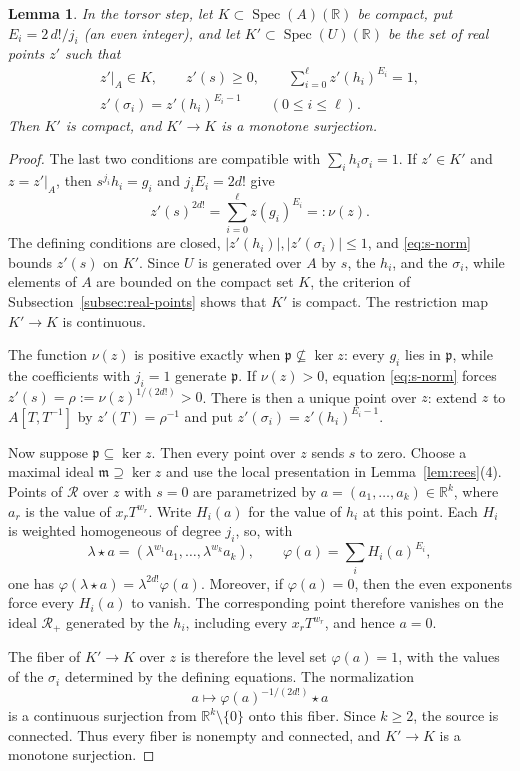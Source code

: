 \documentclass[11pt]{amsart}
\numberwithin{equation}{section}
\newtheorem{lemma}[theorem]{Lemma}
\theoremstyle{definition}
\newcommand{\R}{\mathbb{R}}
\newcommand{\fm}{\mathfrak{m}}
\newcommand{\fp}{\mathfrak{p}}
\newcommand{\cR}{\mathcal{R}}
\DeclareMathOperator{\Spec}{Spec}
\begin{document}
\begin{lemma}\label{lem:sphere-bundle}
In the torsor step, let $K\subset\Spec(A)(\R)$ be compact, put $E_i=2\,d!/j_i$ (an even integer), and let $K'\subset\Spec(U)(\R)$ be the set of real points $z'$ such that
\[
  \begin{gathered}
    z'|_A\in K,\qquad z'(s)\ge0,\qquad
    \sum_{i=0}^\ell z'(h_i)^{E_i}=1,\\
    z'(\sigma_i)=z'(h_i)^{E_i-1}\qquad(0\le i\le\ell).
  \end{gathered}
\]
Then $K'$ is compact, and $K'\to K$ is a monotone surjection.
\end{lemma}

\begin{proof}
The last two conditions are compatible with $\sum_i h_i\sigma_i=1$. If $z'\in K'$ and $z=z'|_A$, then $s^{j_i}h_i=g_i$ and $j_iE_i=2d!$ give
\begin{equation}\label{eq:s-norm}
  z'(s)^{2d!}=\sum_{i=0}^\ell z(g_i)^{E_i}=: \nu(z).
\end{equation}
The defining conditions are closed, $|z'(h_i)|,|z'(\sigma_i)|\le1$, and \eqref{eq:s-norm} bounds $z'(s)$ on $K'$. Since $U$ is generated over $A$ by $s$, the $h_i$, and the $\sigma_i$, while elements of $A$ are bounded on the compact set $K$, the criterion of Subsection~\ref{subsec:real-points} shows that $K'$ is compact. The restriction map $K'\to K$ is continuous.

The function $\nu(z)$ is positive exactly when $\fp\nsubseteq\ker z$: every $g_i$ lies in $\fp$, while the coefficients with $j_i=1$ generate $\fp$. If $\nu(z)>0$, equation \eqref{eq:s-norm} forces $z'(s)=\rho:=\nu(z)^{1/(2d!)}>0$. There is then a unique point over $z$: extend $z$ to $A[T,T^{-1}]$ by $z'(T)=\rho^{-1}$ and put $z'(\sigma_i)=z'(h_i)^{E_i-1}$.

Now suppose $\fp\subseteq\ker z$. Then every point over $z$ sends $s$ to zero. Choose a maximal ideal $\fm\supseteq\ker z$ and use the local presentation in Lemma~\ref{lem:rees}(4). Points of $\cR$ over $z$ with $s=0$ are parametrized by $a=(a_1,\ldots,a_k)\in\R^k$, where $a_r$ is the value of $x_rT^{w_r}$. Write $H_i(a)$ for the value of $h_i$ at this point. Each $H_i$ is weighted homogeneous of degree $j_i$, so, with
\[
  \lambda\star a=(\lambda^{w_1}a_1,\ldots,\lambda^{w_k}a_k),
  \qquad \varphi(a)=\sum_i H_i(a)^{E_i},
\]
one has $\varphi(\lambda\star a)=\lambda^{2d!}\varphi(a)$. Moreover, if $\varphi(a)=0$, then the even exponents force every $H_i(a)$ to vanish. The corresponding point therefore vanishes on the ideal $\cR_+$ generated by the $h_i$, including every $x_rT^{w_r}$, and hence $a=0$.

The fiber of $K'\to K$ over $z$ is therefore the level set $\varphi(a)=1$, with the values of the $\sigma_i$ determined by the defining equations. The normalization
\[
  a\longmapsto \varphi(a)^{-1/(2d!)}\star a
\]
is a continuous surjection from $\R^k\setminus\{0\}$ onto this fiber. Since $k\ge2$, the source is connected. Thus every fiber is nonempty and connected, and $K'\to K$ is a monotone surjection.
\end{proof}
\end{document}
